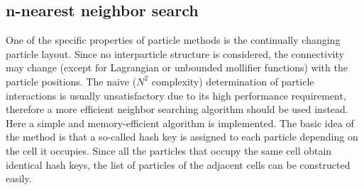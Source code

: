 \documentclass[a4paper,12pt,openany]{book}
\theoremstyle{break}
\begin{document}
\subsection{n-nearest neighbor search} \label{sec:neighbor_search}
One of the specific properties of particle methods is the continually changing particle layout. Since no interparticle structure is considered, the connectivity may change (except for Lagrangian or unbounded mollifier functions) with the particle positions. The naive ($N^2$ complexity) determination of particle interactions is usually unsatisfactory due to its high performance requirement, therefore a more efficient neighbor searching algorithm should be used instead. Here a simple and memory-efficient algorithm is implemented. The basic idea of the method is that a so-called hash key is assigned to each particle depending on the cell it occupies. Since all the particles that occupy the same cell obtain identical hash keys, the list of particles of the adjacent cells can be constructed easily.
\end{document}
